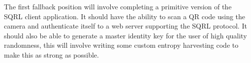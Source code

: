 The first fallback position will involve completing a primitive version of the SQRL client application. It should have the ability to scan a QR code using the camera and authenticate itself to a web server supporting the SQRL protocol. It should also be able to generate a master identity key for the user of high quality randomness, this will involve writing some custom entropy harvesting code to make this as strong as possible.
